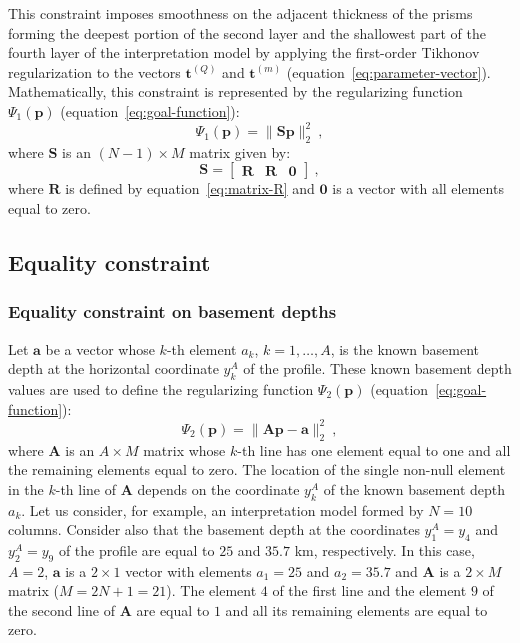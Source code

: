 \documentclass[manuscript]{geophysics}
\begin{document}
This constraint imposes smoothness on the adjacent thickness of the prisms forming the
deepest portion of the second layer and the shallowest part of the fourth layer
of the interpretation model by applying the first-order Tikhonov regularization
\citep{aster-etal2005} to the vectors $\mathbf{t}^{(Q)}$ and $\mathbf{t}^{(m)}$ 
(equation~\ref{eq:parameter-vector}). 
Mathematically, this constraint is represented by the regularizing function
$\Psi_{1}(\mathbf{p})$ (equation~\ref{eq:goal-function}):
\begin{equation}
\Psi_{1}(\mathbf{p}) = \| \mathbf{S}\mathbf{p} \|_{2}^{2} \: ,
\label{eq:smootheness-contraint}
\end{equation}
where $\mathbf{S}$ is an $\left( N-1 \right) \times M$ matrix given by:
\begin{equation}
\mathbf{S} = \begin{bmatrix}
\mathbf{R} & \mathbf{R} & \mathbf{0}
\end{bmatrix} \: ,
\label{eq:matrix-S}
\end{equation}
where $\mathbf{R}$ is defined by equation~\ref{eq:matrix-R} and $\mathbf{0}$
is a vector with all elements equal to zero.


\subsection{Equality constraint}

\subsubsection*{Equality constraint on basement depths}

Let $\mathbf{a}$ be a vector whose $k$-th element $a_{k}$,
$k = 1, \dots, A$, is the known basement depth at the horizontal coordinate
$y^{A}_{k}$ of the profile. These known basement depth values are used to define 
the regularizing function $\Psi_{2}(\mathbf{p})$ 
(equation~\ref{eq:goal-function}):
\begin{equation}
\Psi_{2}(\mathbf{p}) = \| \mathbf{A}\mathbf{p} - \mathbf{a} \|_{2}^{2} \: ,
\label{eq:equality-constraint-basement}
\end{equation}
where $\mathbf{A}$ is an $A \times M$ matrix whose $k$-th line has one element 
equal to one and all the remaining elements equal to zero. The location of the
single non-null element in the $k$-th line of $\mathbf{A}$ depends on the coordinate
$y^{A}_{k}$ of the known basement depth $a_{k}$. Let us consider, 
for example, an interpretation model formed by $N = 10$ columns. Consider also that 
the basement depth at the coordinates $y^{A}_{1} = y_{4}$ and $y^{A}_{2} = y_{9}$ of
the profile are equal to $25$ and $35.7$ km, respectively. In this case, $A = 2$,
$\mathbf{a}$ is a $2 \times 1$ vector with elements $a_{1} = 25$ and $a_{2} = 35.7$
and $\mathbf{A}$ is a $2 \times M$ matrix ($M = 2N + 1 = 21$). The element $4$ of the
first line and the element $9$ of the second line of $\mathbf{A}$ are equal to $1$ and
all its remaining elements are equal to zero.
\end{document}
